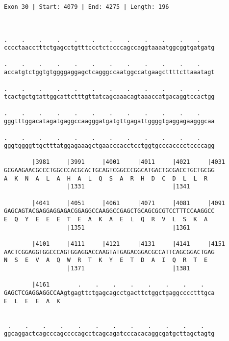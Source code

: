 \documentclass{article}
\begin{document}
\begin{Verbatim}
Exon 30 | Start: 4079 | End: 4275 | Length: 196



.    .    .    .    .    .    .    .    .    .    .    .    
cccctaacctttctgagcctgtttccctctccccagccaggtaaaatggcggtgatgatg
                                                            
.    .    .    .    .    .    .    .    .    .    .    .    
accatgtctggtgtggggaggagctcagggccaatggccatgaagcttttcttaaatagt
                                                            
.    .    .    .    .    .    .    .    .    .    .    .    
tcactgctgtattggcattctttgttatcagcaaacagtaaaccatgacaggtccactgg
                                                            
.    .    .    .    .    .    .    .    .    .    .    .    
gggtttggacatagatgaggccaagggatgatgttgagattggggtgaggagaagggcaa
                                                            
.    .    .    .    .    .    .    .    .    .    .    .    
gggtggggttgctttatggagaaagctgaacccacctcctggtgcccacccctccccagg
                                                            
        |3981     |3991     |4001     |4011     |4021     |4031
GCGAAGAACGCCCTGGCCCACGCACTGCAGTCGGCCCGGCATGACTGCGACCTGCTGCGG
A  K  N  A  L  A  H  A  L  Q  S  A  R  H  D  C  D  L  L  R  
                  |1331                         |1341       
  
        |4041     |4051     |4061     |4071     |4081     |4091
GAGCAGTACGAGGAGGAGACGGAGGCCAAGGCCGAGCTGCAGCGCGTCCTTTCCAAGGCC
E  Q  Y  E  E  E  T  E  A  K  A  E  L  Q  R  V  L  S  K  A  
                  |1351                         |1361       
  
        |4101     |4111     |4121     |4131     |4141     |4151
AACTCGGAGGTGGCCCAGTGGAGGACCAAGTATGAGACGGACGCCATTCAGCGGACTGAG
N  S  E  V  A  Q  W  R  T  K  Y  E  T  D  A  I  Q  R  T  E  
                  |1371                         |1381       
  
        |4161        .    .    .    .    .    .    .    .   
GAGCTCGAGGAGGCCAAgtgagttctgagcagcctgacttctggctgaggcccctttgca
E  L  E  E  A  K                                            
                                                            
  
 .    .    .    .    .    .    .    .    .    .    .    .   
ggcaggactcagcccagccccagcctcagcagatcccacacaggcgatgcttagctagtg
                                                            

\end{Verbatim}
\end{document}
